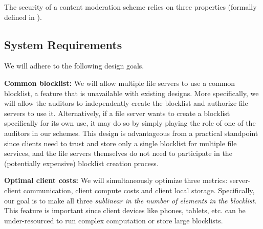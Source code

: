 % 
The security of a content moderation scheme relies on three properties (formally defined in ).
\fi 







\iffalse
\subsection{System Requirements}
%
We will adhere to the following design goals.

\itemListStart
	
	\item \textbf{Common blocklist:} We will allow multiple file servers to use a common blocklist, 
	a feature that is unavailable with existing designs. More specifically, we will allow 
	the auditors to independently create the blocklist and authorize file servers to use it. 
	Alternatively, if a file server wants to create a 	blocklist specifically for its own use, it may do 
	so by simply playing the role of one of the auditors in our schemes. This design is 
	advantageous from a practical standpoint since clients need to trust and store only a single 
	blocklist for multiple file services, and the file servers themselves do not need to participate 
	in the (potentially expensive) blocklist creation process. 
	
	
%	
	
	
	\item \textbf{Optimal client costs:} We will simultaneously optimize three 
	metrics: server-client communication, client compute costs and client local storage. Specifically, our 
	goal is to make all three \textit{sublinear in the number of elements in the blocklist}. This feature is important since client devices like 
	phones, tablets, etc. can be under-resourced to run complex computation or 
	store large blocklists.  
		
